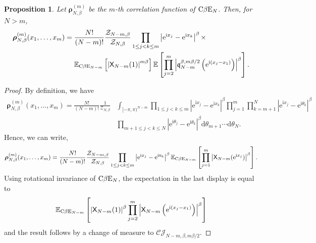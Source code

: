 \documentclass[]{article}
\newtheorem{prop}[thm]{Proposition}
\begin{document}
\begin{prop}\label{CbetaECorr}
Let $\boldsymbol{\rho}_{N,\beta}^{(m)}$ be the $m$-th correlation function of $\textnormal{C}\beta \textnormal{E}_N$. Then, for $N > m$, 
\begin{align*}
\boldsymbol{\rho}_{N,\beta}^{(m)}(x_1,\dots,x_m)&=\frac{N!}{(N-m)!}\frac{\mathcal{Z}_{N-m,\beta}}{\mathcal{Z}_{N,\beta}}  \prod_{1 \le j <k \le m}\left|\mathrm{e}^{\mathrm{i}x_j}-\mathrm{e}^{\mathrm{i}x_k}\right|^\beta \times  \\ 
& \ \ \ \  \mathbb{E}_{\textnormal{C}\beta \textnormal{E}_{N-m}}\left[\left|\mathsf{X}_{N-m}(1)\right|^{m\beta}\right] \mathbb{E}\left[\prod_{j=2}^m \left|\mathfrak{q}_{N-m}^{\beta,m\beta/2}\left(\mathrm{e}^{\mathrm{i}(x_j-x_1)}\right)\right|^\beta\right].
\end{align*}
\end{prop}
\begin{proof}
By definition, we have
\begin{align*}
\boldsymbol{\rho}_{N,\beta}^{(m)}(x_1,\dots,x_m)=\frac{N!}{(N-m)!} \frac{1}{\mathcal{Z}_{N,\beta}}&\int_{[-\pi,\pi)^{N-m}} \prod_{1\le j <k \le m}\left|\mathrm{e}^{\mathrm{i}x_j}-\mathrm{e}^{\mathrm{i}x_k}\right|^\beta \prod_{j=1}^m \prod_{k=m+1}^N\left|\mathrm{e}^{\mathrm{i}x_j}-\mathrm{e}^{\mathrm{i}\theta_k}\right|^\beta \\
&\prod_{m+1 \le j <k \le N}\left|\mathrm{e}^{\mathrm{i}\theta_j}-\mathrm{e}^{\mathrm{i}\theta_k}\right|^\beta\mathrm{d}\theta_{m+1}\cdots \mathrm{d}\theta_N.
\end{align*}
Hence, we can write,
\begin{equation*}
\boldsymbol{\rho}_{N,\beta}^{(m)}(x_1,\dots,x_m)=\frac{N!}{(N-m)!}\frac{\mathcal{Z}_{N-m,\beta}}{\mathcal{Z}_{N,\beta}}\prod_{1\le j<k \le m}\left|\mathrm{e}^{\mathrm{i}x_j}-\mathrm{e}^{\mathrm{ix_k}}\right|^\beta \mathbb{E}_{\textnormal{C}\beta \textnormal{E}_{N-m}}\left[\prod_{j=1}^m\left|\mathsf{X}_{N-m}(\mathrm{e}^{\mathrm{i}x_j})\right|^\beta\right].
\end{equation*}
Using rotational invariance of $\textnormal{C}\beta \textnormal{E}_N$, the expectation in the last display is equal to
\begin{equation*}
\mathbb{E}_{\textnormal{C}\beta \textnormal{E}_{N-m}}\left[\left|\mathsf{X}_{N-m}(1)\right|^\beta \prod_{j=2}^m \left|\mathsf{X}_{N-m}\left(\mathrm{e}^{\mathrm{i}(x_j-x_1)}\right)\right|^\beta\right]
\end{equation*}
and the result follows by a change of measure to $\mathcal{CJ}_{N-m,\beta,m\beta/2}$.
\end{proof}
\end{document}

